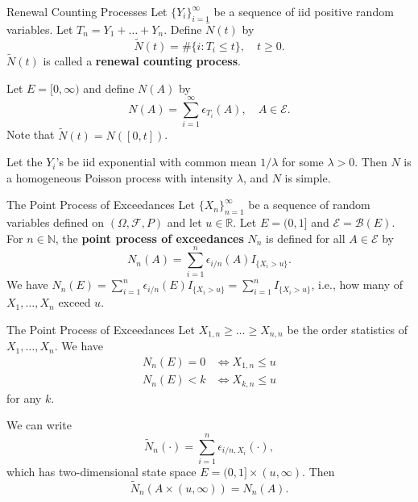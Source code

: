 \documentclass{beamer}
\begin{document}
\begin{frame}{Renewal Counting Processes}
    Let $\{Y_i\}_{i = 1}^{\infty}$ be a sequence of iid positive random variables. Let $T_n = Y_1 + \ldots + Y_n$. Define $\tilde{N}(t)$ by
    \[
    \tilde{N}(t) = \#\{i : T_i \le t\}, \quad t \ge 0.
    \]
    $\tilde{N}(t)$ is called a \textbf{renewal counting process}.

    \smallskip
    
    Let $E = [0, \infty)$ and define $N(A)$ by
    \[
    N(A) = \sum_{i = 1}^{\infty} \epsilon_{T_i}(A), \quad A \in \mathcal{E}.
    \]
    Note that $\tilde{N}(t) = N([0, t])$.

    \smallskip

    Let the $Y_i$'s be iid exponential with common mean $1 / \lambda$ for some $\lambda > 0$. Then $N$ is a homogeneous Poisson process with intensity $\lambda$, and $N$ is simple.
\end{frame}

\begin{frame}{The Point Process of Exceedances}
    Let $\{X_n\}_{n = 1}^{\infty}$ be a sequence of random variables defined on $(\Omega, \mathcal{F}, P)$ and let $u \in \mathbb{R}$. Let $E = (0, 1]$ and $\mathcal{E} = \mathcal{B}(E)$. For $n \in \mathbb{N}$, the \textbf{point process of exceedances} $N_n$ is defined for all $A \in \mathcal{E}$ by
    \[
    N_n(A) = \sum_{i = 1}^n \epsilon_{i / n}(A)I_{\{X_i > u\}}.
    \]
    We have $N_n(E) = \sum_{i = 1}^n \epsilon_{i / n}(E)I_{\{X_i > u\}} = \sum_{i = 1}^n I_{\{X_i > u\}}$, i.e., how many of $X_1, \ldots, X_n$ exceed $u$.
\end{frame}

\begin{frame}{The Point Process of Exceedances}
    Let $X_{1, n} \ge \ldots \ge X_{n, n}$ be the order statistics of $X_1, \ldots, X_n$. We have
    \begin{align*}
        N_n(E) = 0 &\iff X_{1, n} \le u \\
        N_n(E) < k &\iff X_{k, n} \le u
    \end{align*}
    for any $k$.

    \smallskip

    We can write
    \[
    \tilde{N}_n(\cdot) = \sum_{i = 1}^n \epsilon_{i / n, X_i}(\cdot),
    \]
    which has two-dimensional state space $E = (0, 1] \times (u, \infty)$. Then
    \[
    \tilde{N}_n(A \times (u, \infty)) = N_n(A).
    \]
\end{frame}
\end{document}
